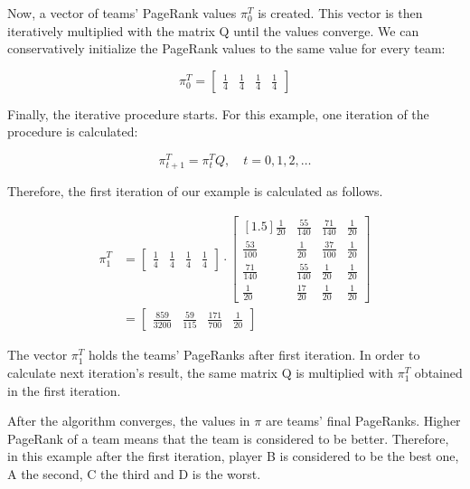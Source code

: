 \begin{example}
Now, a vector of teams' PageRank values $\pi_0^T$ is created. This vector is then iteratively multiplied with the matrix Q until the values converge. We can conservatively initialize the PageRank values to the same value for every team:

\begin{equation*}
\pi_0^T = 
\begin{bmatrix}
\frac{1}{4} & \frac{1}{4} & \frac{1}{4} & \frac{1}{4}
\end{bmatrix}
\end{equation*}

Finally, the iterative procedure starts. For this example, one iteration of the procedure is calculated:

\begin{equation*}
\pi_{t+1}^T = \pi_t^TQ,\quad t= 0, 1, 2, \dots
\end{equation*}

Therefore, the first iteration of our example is calculated as follows.

\begin{align*}
\pi_1^T &= 
\begin{bmatrix}
\frac{1}{4} & \frac{1}{4} & \frac{1}{4} & \frac{1}{4}
\end{bmatrix} 
\cdot
\begin{bmatrix}[1.5]
\frac{1}{20} & \frac{55}{140} & \frac{71}{140} & \frac{1}{20} \\
\frac{53}{100} & \frac{1}{20} & \frac{37}{100} & \frac{1}{20} \\
\frac{71}{140} & \frac{55}{140} & \frac{1}{20} & \frac{1}{20} \\
\frac{1}{20} & \frac{17}{20} & \frac{1}{20} & \frac{1}{20}
\end{bmatrix} \\[1em]
&= 
\begin{bmatrix}
\frac{859}{3200} & \frac{59}{115} & \frac{171}{700} & \frac{1}{20}
\end{bmatrix}
\end{align*}

The vector $\pi_1^T$ holds the teams' PageRanks after first iteration. In order to calculate next iteration's result, the same matrix Q is multiplied with $\pi_1^T$ obtained in the first iteration.

After the algorithm converges, the values in $\pi$ are teams' final PageRanks. Higher PageRank of a team means that the team is considered to be better. Therefore, in this example after the first iteration, player B is considered to be the best one, A the second, C the third and D is the worst.
\end{example}

